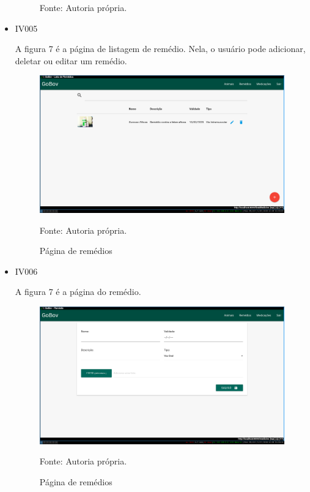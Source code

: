 \begin{itemize}
\begin{figure}[H]
\begin{center}
		Fonte: Autoria própria.
	\end{center}
\end{figure}

\newpage
\item IV005

A figura 7 é a página de listagem de remédio. Nela, o usuário pode adicionar, deletar ou editar um remédio.
\begin{figure}[H]
	\begin{center}
		\caption{Página de remédios}
		\includegraphics[width=13cm]{../img/prototipos/listaRemedio.png}

		Fonte: Autoria própria.
	\end{center}
\end{figure}

\item IV006

A figura 7 é a página do remédio.
\begin{figure}[H]
	\begin{center}
		\caption{Página de remédios}
		\includegraphics[width=13cm]{../img/prototipos/addRemedio.png}

		Fonte: Autoria própria.
	\end{center}
\end{figure}


\end{itemize}
